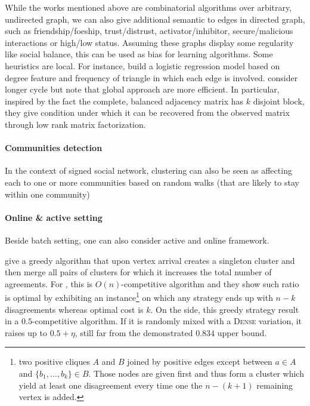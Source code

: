 While the works mentioned above are combinatorial algorithms over arbitrary,
undirected graph, we can also give additional semantic to edges in directed
graph, such as friendship/foeship, trust/distrust, activator/inhibitor,
secure/malicious interactions or high/low status. Assuming these graphs
display some regularity like social balance, this can be used as bias for
learning algorithms. Some heuristics are local. For instance,
\textcite{Leskovec2010} build a logistic regression model based on degree
feature and frequency of triangle in which each edge is involved.
\Textcite{LowRankCompletion14} consider longer cycle but note that global
approach are more efficient. In particular, inspired by the fact the complete,
balanced adjacency matrix has $k$ disjoint block, they give condition under
which it can be recovered from the observed matrix through low rank matrix
factorization.

\paragraph{Communities detection}
In the context of signed social network, clustering can also be seen as
affecting each to one or more communities
\autocite{Yang2007} based on random walks (that are likely to stay within one
community)
\autocites{Yang2007}{Traag2009}{Doreian2009}{Anchuri2012}{Amelio2013}{Li2013}{Chen14}{Jiang2015}


\paragraph{Online \& active setting}
Beside batch setting, one can also consider active
\autocites{Cesa-Bianchi2012b}{Cesa-Bianchi2012a} and online
\autocite{Gentile2013} framework.

\Textcite{mathieu:inria-00455771} give a greedy algorithm that upon vertex
arrival creates a singleton cluster and then merge all pairs of clusters for
which it increases the total number of agreements. For \mind{}, this is
$O(n)$-competitive algorithm and they show such ratio is optimal by exhibiting
an instance\footnote{two positive cliques $A$ and $B$ joined by positive edges
except between $a\in A$ and $\{b_1,\ldots, b_k\}\in B$. Those nodes are given
first and thus form a cluster which yield at least one disagreement every time
one the $n-(k+1)$ remaining vertex is added.} on which any strategy ends up with $n - k$
disagreements whereas optimal cost is $k$. On the \maxa{} side, this greedy
strategy result in a $0.5$-competitive algorithm. If it is randomly mixed with
a \textsc{Dense} variation, it raises up to $0.5+\eta$, still far from the
demonstrated $0.834$ upper bound.

